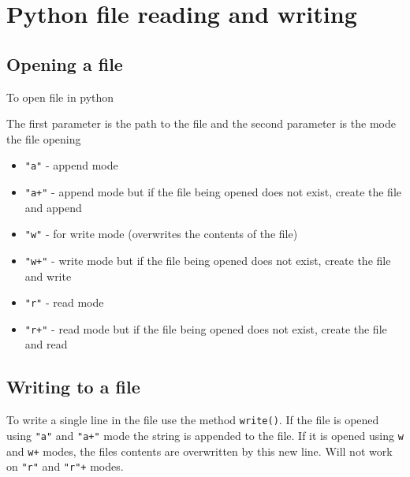 \section{Python file reading and
writing}\label{python-introduction.md__python-file-reading-and-writing}

\subsection{Opening a
file}\label{python-introduction.md__opening-a-file}

To open file in python

\begin{Shaded}
\begin{Highlighting}[]
\OperatorTok{=} \NormalTok{(}\NormalTok{,}\NormalTok{) }
\end{Highlighting}
\end{Shaded}

The first parameter is the path to the file and the second parameter is
the mode the file opening

\begin{itemize}
\tightlist
\item
  \texttt{"a"} - append mode
\item
  \texttt{"a+"} - append mode but if the file being opened does not
  exist, create the file and append
\item
  \texttt{"w"} - for write mode (overwrites the contents of the file)
\item
  \texttt{"w+"} - write mode but if the file being opened does not
  exist, create the file and write
\item
  \texttt{"r"} - read mode
\item
  \texttt{"r+"} - read mode but if the file being opened does not exist,
  create the file and read
\end{itemize}

\subsection{Writing to a
file}\label{python-introduction.md__writing-to-a-file}

To write a single line in the file use the method \texttt{write()}. If
the file is opened using \texttt{"a"} and \texttt{"a+"} mode the string
is appended to the file. If it is opened using \texttt{w} and
\texttt{w+} modes, the files contents are overwritten by this new line.
Will not work on \texttt{"r"} and \texttt{"r"+} modes.

